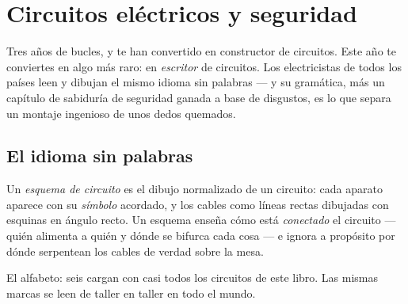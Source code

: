 \chapter{Circuitos eléctricos y seguridad}\label{ch:g6:circuits-and-safety}

Tres años de bucles,  y  te han convertido en
constructor de circuitos. Este año te conviertes en algo más raro: en
\emph{escritor} de circuitos. Los electricistas de todos los países
leen y dibujan el mismo idioma sin palabras --- y su gramática, más un
capítulo de sabiduría de seguridad ganada a base de disgustos, es lo
que separa un montaje ingenioso de unos dedos quemados.

\section{El idioma sin palabras}

\begin{definition}\label{def:g6:circuits-and-safety:diagram}
Un \emph{esquema de circuito} es el dibujo
normalizado de un circuito: cada aparato aparece con su
\emph{símbolo} acordado, y los cables como líneas
rectas dibujadas con esquinas en ángulo recto. Un esquema enseña cómo
está \emph{conectado} el circuito --- quién alimenta a quién y dónde
se bifurca cada cosa --- e ignora a propósito por dónde serpentean los
cables de verdad sobre la mesa.
\end{definition}

\begin{omfigure}

{\small El alfabeto: seis  cargan con casi todos los
circuitos de este libro. Las mismas marcas se leen de taller en taller
en todo el mundo.}
\end{omfigure}


